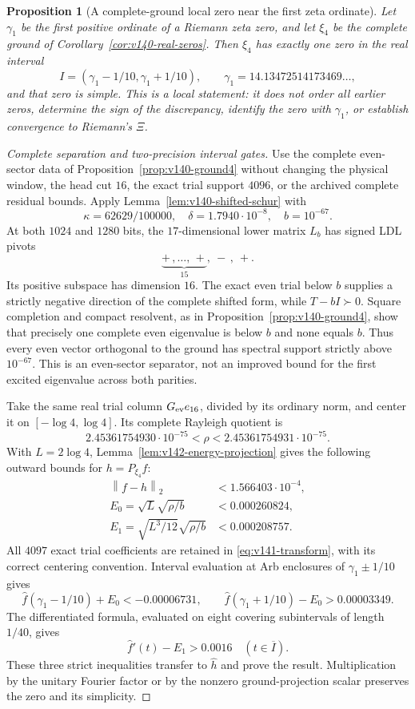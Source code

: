 \documentclass[11pt]{article}
\newtheorem{proposition}[theorem]{Proposition}
\theoremstyle{remark}
\newcommand{\norm}[1]{\left\lVert #1\right\rVert}
\begin{document}
\begin{proposition}[A complete-ground local zero near the first zeta ordinate]
\label{prop:v142-ground-zero}
Let $\gamma_1$ be the first positive ordinate of a Riemann zeta zero,
and let $\xi_4$ be the complete ground of
Corollary~\ref{cor:v140-real-zeros}. Then $\widehat\xi_4$ has exactly
one zero in the real interval
\[
 I=(\gamma_1-1/10,\gamma_1+1/10),
 \qquad \gamma_1=14.13472514173469\ldots,
\]
and that zero is simple. This is a local statement: it does not order
all earlier zeros, determine the sign of the discrepancy, identify
the zero with $\gamma_1$, or establish convergence to Riemann's $\Xi$.
\end{proposition}
\begin{proof}[Complete separation and two-precision interval gates]
Use the complete even-sector data of
Proposition~\ref{prop:v140-ground4} without changing the physical window,
the head cut $16$, the exact trial support $4096$, or the archived
complete residual bounds. Apply Lemma~\ref{lem:v140-shifted-schur} with
\[
 \kappa=62629/100000,\quad \delta=1.7940\cdot10^{-8},
 \quad b=10^{-67}.
\]
At both $1024$ and $1280$ bits, the $17$-dimensional lower matrix
$L_b$ has signed LDL pivots
\[
 \underbrace{+\,,\ldots,\,+}_{15},\ -\,,\ +.
\]
Its positive subspace has dimension $16$. The exact even trial below
$b$ supplies a strictly negative direction of the complete shifted
form, while $T-bI\succ0$. Square completion and compact resolvent,
as in Proposition~\ref{prop:v140-ground4}, show that precisely one
complete even eigenvalue is below $b$ and none equals $b$.
Thus every even vector orthogonal to the ground has spectral support
strictly above $10^{-67}$. This is an even-sector separator, not an
improved bound for the first excited eigenvalue across both parities.

Take the same real trial column $G_{\rm ev}e_{16}$, divided by its
ordinary norm, and center it on $[-\log4,\log4]$. Its complete
Rayleigh quotient is
\[
 2.45361754930\cdot10^{-75}<\rho<2.45361754931\cdot10^{-75}.
\]
With $L=2\log4$, Lemma~\ref{lem:v142-energy-projection} gives the
following outward bounds for $h=P_{\xi_4}f$:
\begin{align*}
 \norm{f-h}_2&<1.566403\cdot10^{-4},\\
 E_0=\sqrt L\sqrt{\rho/b}&<0.000260824,\\
 E_1=\sqrt{L^3/12}\sqrt{\rho/b}&<0.000208757.
\end{align*}
All $4097$ exact trial coefficients are retained in
\eqref{eq:v141-transform}, with its correct centering convention.
Interval evaluation at Arb enclosures of $\gamma_1\pm1/10$ gives
\[
 \widehat f(\gamma_1-1/10)+E_0<-0.00006731,
 \qquad
 \widehat f(\gamma_1+1/10)-E_0>0.00003349.
\]
The differentiated formula, evaluated on eight covering subintervals
of length $1/40$, gives
\[
 \widehat f'(t)-E_1>0.0016\quad(t\in\overline I).
\]
These three strict inequalities transfer to $\widehat h$ and prove
the result. Multiplication by the unitary Fourier factor or by the
nonzero ground-projection scalar preserves the zero and its simplicity.


\end{proof}
\end{document}
